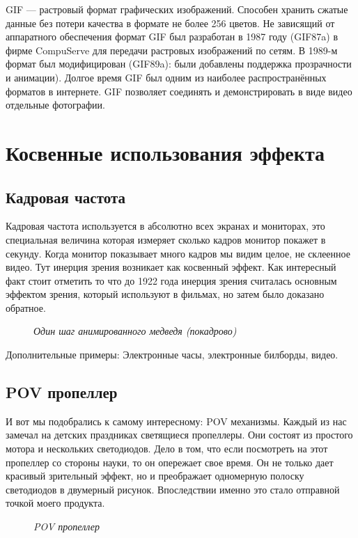 \documentclass[a4paper, 12pt]{article}
\renewcommand{\sectionmark}[1]{\markright{#1}}
\newcommand{\image}[3]{
	\begin{figure}[ht]
		\center{\texttt{[image: img/\#1]} }
		\caption{\textit{#3}}\end{figure}
}
\begin{document}
GIF — растровый формат графических изображений. Способен хранить
сжатые данные без потери качества в формате не более 256 цветов. Не
зависящий от аппаратного обеспечения формат GIF был разработан в 1987
году (GIF87a) в фирме CompuServe для передачи растровых изображений по
сетям. В 1989-м формат был модифицирован (GIF89a): были добавлены
поддержка прозрачности и анимации). Долгое время GIF был одним из
наиболее распространённых форматов в интернете. GIF позволяет соединять
и демонстрировать в виде видео отдельные фотографии.
\newpage
\section{Косвенные использования эффекта}
\pagestyle{fancy}
\renewcommand{\sectionmark}[1]{\markright{#1}}
\fancyhf{}
\fancyhead[R]{\bfseries\thepage}
\fancyhead[LO]{\bfseries\rightmark}

\subsection{Кадровая частота}

Кадровая частота используется в абсолютно всех экранах и мониторах,
это специальная величина которая измеряет сколько кадров монитор покажет
в секунду. Когда монитор показывает много кадров мы видим целое, не
склеенное видео. Тут инерция зрения возникает как косвенный эффект. Как
интересный факт стоит отметить то что до 1922 года инерция зрения
считалась основным эффектом зрения, который используют в фильмах, но
затем было доказано обратное.

\image{Медведь.jpg}{80}{Один шаг анимированного медведя (покадрово)}

Дополнительные примеры: Электронные часы, электронные
билборды, видео.

\subsection{POV пропеллер}

И вот мы подобрались к самому интересному: POV механизмы. Каждый
из нас замечал на детских праздниках светящиеся пропеллеры. Они состоят
из простого мотора и нескольких светодиодов. Дело в том, что если
посмотреть на этот пропеллер со стороны науки, то он опережает свое время.
Он не только дает красивый зрительный эффект, но и преображает
одномерную полоску светодиодов в двумерный рисунок. Впоследствии
именно это стало отправной точкой моего продукта.

\image{пропеллер.jpg}{200}{POV пропеллер}
\end{document}
